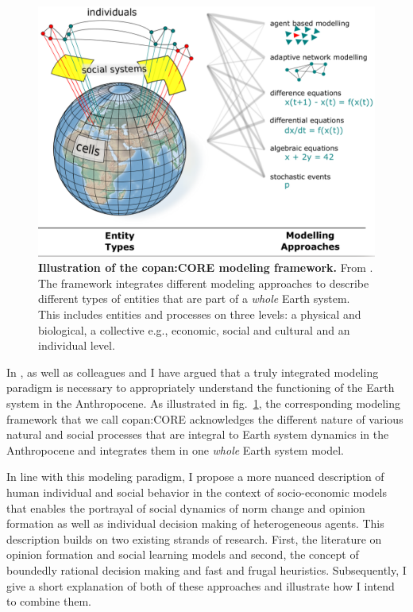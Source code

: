 \begin{figure}[t]
  \centering
  \includegraphics[width = .8 \textwidth]{figures/CORE.png}
  \caption[Illustration of the copan:CORE modeling framework]{\textbf{Illustration of the copan:CORE modeling framework.} From \citep[P3]{Donges2018}. The framework integrates different modeling approaches to describe different types of entities that are part of a \emph{whole} Earth system. This includes entities and processes on three levels: a physical and biological, a collective e.g., economic, social and cultural and an individual level.}
  \label{fig:Core}
\end{figure}
In \citep[P2]{Mueller-Hansen2017}, \citep[P3]{Donges2018} as well as \citep{Heitzig2015a, Barfuss2017, Nitzbon2017, Lade2017} colleagues and I have argued that a truly integrated modeling paradigm is necessary to appropriately understand the functioning of the Earth system in the Anthropocene. As illustrated in fig.~\ref{fig:Core}, the corresponding modeling framework that we call copan:CORE acknowledges the different nature of various natural and social processes that are integral to Earth system dynamics in the Anthropocene and integrates them in one \emph{whole} Earth system model.

In line with this modeling paradigm, I propose a more nuanced description of human individual and social behavior in the context of socio-economic models that enables the portrayal of social dynamics of norm change and opinion formation as well as individual decision making of heterogeneous agents. 
This description builds on two existing strands of research. First, the literature on opinion formation and social learning models and second, the concept of boundedly rational decision making and fast and frugal heuristics. Subsequently, I give a short explanation of both of these approaches and illustrate how I intend to combine them.

